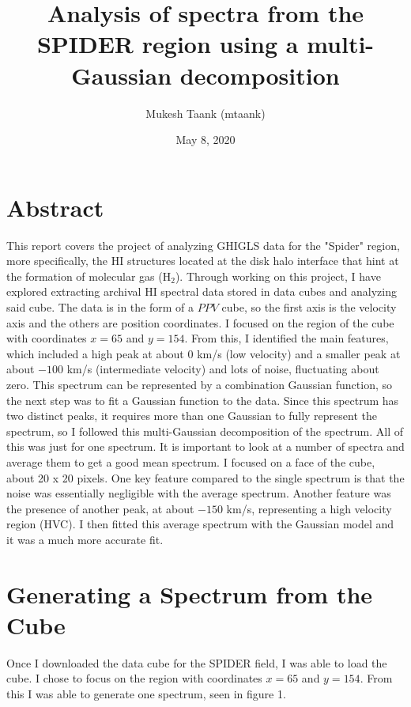 \documentclass[12pt]{report}
\title{Analysis of spectra from the SPIDER region using a multi-Gaussian decomposition}
\author{Mukesh Taank (mtaank)}
\date{May 8, 2020}
\begin{document}
\maketitle


\section*{Abstract}
This report covers the project of analyzing GHIGLS data for the "Spider" region, more specifically, the HI structures located at the disk halo interface that hint at the formation of molecular gas (H$_{2}$).
Through working on this project, I have explored extracting  archival HI spectral data stored in data cubes and analyzing said cube.
The data is in the form of a $PPV$ cube, so the first axis is the velocity axis and the others are position coordinates. I focused on the region of the cube with coordinates $x = 65$ and $y = 154$.
From this, I identified the main features, which included a high peak at about $0$ km/s (low velocity) and a smaller peak at about $-100$ km/s (intermediate velocity) and lots of noise, fluctuating about zero.
This spectrum can be represented by a combination Gaussian function, so the next step was to fit a Gaussian function to the data.
Since this spectrum has two distinct peaks, it requires more than one Gaussian to fully represent the spectrum, so I followed this multi-Gaussian decomposition of the spectrum. 
All of this was just for one spectrum. It is important to look at a number of spectra and average them to get a good mean spectrum. 
I focused on a face of the cube, about 20 x 20 pixels. 
One key feature compared to the single spectrum is that the noise was essentially negligible with the average spectrum.
Another feature was the presence of another peak, at about $-150$ km/s, representing a high velocity region (HVC).
I then fitted this average spectrum with the Gaussian model and it was a much more accurate fit. 
\newpage


\section*{Generating a Spectrum from the Cube}
Once I downloaded the data cube for the SPIDER field, I was able to load the cube. I chose to focus on the region with coordinates $x = 65$ and $y = 154$.  From this I was able to generate one spectrum, seen in figure 1.
\end{document}
